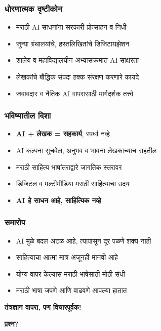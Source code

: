 \begin{frame}[fragile]\frametitle{धोरणात्मक दृष्टीकोन}

\begin{itemize}
\item मराठी AI साधनांना सरकारी प्रोत्साहन व निधी
\item जुन्या ग्रंथालयांचे, हस्तलिखितांचे डिजिटायझेशन
\item शालेय व महाविद्यालयीन अभ्यासक्रमात AI साक्षरता
\item लेखकांचे बौद्धिक संपदा हक्क संरक्षण करणारे कायदे
\item जबाबदार व नैतिक AI वापरासाठी मार्गदर्शक तत्त्वे
\end{itemize}

\end{frame}

\begin{frame}[fragile]\frametitle{भविष्यातील दिशा}

\begin{itemize}
\item \textbf{AI + लेखक = सहकार्य}, स्पर्धा नव्हे
\item AI कल्पना सुचवेल, अनुभव व भावना लेखकाच्याच राहतील
\item मराठी साहित्य भाषांतराद्वारे जागतिक स्तरावर
\item डिजिटल व मल्टीमीडिया मराठी साहित्याचा उदय
\item \textbf{AI हे साधन आहे, साहित्यिक नव्हे}
\end{itemize}

\end{frame}

\begin{frame}[fragile]\frametitle{समारोप}

\begin{itemize}
\item AI मुळे बदल अटळ आहे, त्यापासून दूर पळणे शक्य नाही
\item साहित्याचा आत्मा मात्र अजूनही मानवी आहे
\item योग्य वापर केल्यास मराठी भाषेसाठी मोठी संधी
\item मराठी भाषा जपणे आणि वाढवणे आपल्या हातात
\end{itemize}

\vspace{0.3cm}
\begin{center}
\textbf{\large तंत्रज्ञान वापरा, पण विचारपूर्वक!}
\end{center}

\vspace{0.4cm}
\begin{center}
{\large \textbf{प्रश्न?}}
\end{center}

\end{frame}
